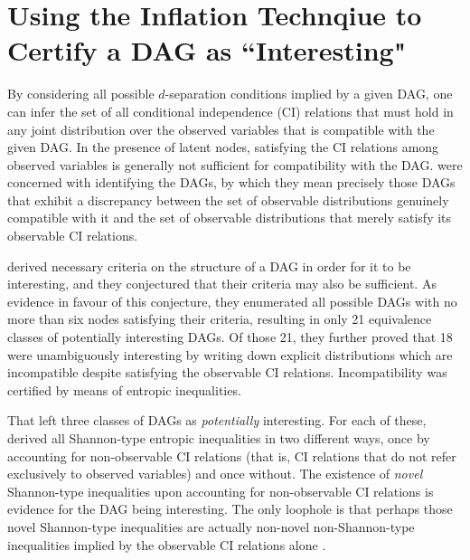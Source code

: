 \documentclass[aps,english,superscriptaddress,onecolumn,twoside,longbibliography,pra,floatfix,fleqn,nofootinbib]{revtex4-1}%
\newcommand*{\tblue}[1]{{\color{MidnightBlue}{\textbf{#1}}}}
\theoremstyle{definition}
\begin{document}
\section{Using the Inflation Technqiue to Certify a DAG as ``Interesting"\label{sec:interestingproof}}

By considering all possible $d$-separation conditions implied by a given DAG, one can infer the set of all conditional independence (CI) relations that must hold in any joint distribution over the observed variables that is compatible with the given DAG. In the presence of latent nodes, satisfying the CI relations among observed variables 
is generally not sufficient for compatibility with the DAG. \citet{pusey2014gdag} were concerned with identifying the \tblue{interesting} DAGs, by which they mean precisely those DAGs that exhibit a discrepancy between the set of observable distributions genuinely compatible with it and the set of observable distributions that merely satisfy its observable CI relations.

\citet{pusey2014gdag} derived necessary criteria on the structure of a DAG in order for it to be interesting, and they conjectured that their criteria may also be sufficient. As evidence in favour of this conjecture, they enumerated all possible DAGs with no more than six nodes satisfying their criteria, resulting in 
only 21 equivalence classes of potentially interesting DAGs.
Of those 21, they further proved that 18 were unambiguously interesting by writing down explicit distributions which are incompatible despite satisfying the observable CI relations. Incompatibility was certified by means of entropic inequalities. 

That left three classes of DAGs  as \emph{potentially} interesting. For each of these, \citet{pusey2014gdag} derived all Shannon-type entropic inequalities in two different ways, once by accounting for non-observable CI relations (that is, CI relations that do not refer exclusively to observed variables) and once without. The existence of \emph{novel} Shannon-type inequalities upon accounting for non-observable CI relations is evidence for the DAG being interesting. The only loophole is that perhaps those novel Shannon-type inequalities are actually non-novel non-Shannon-type inequalities implied by the observable CI relations alone \cite{pusey2014gdag}. %
\end{document}
